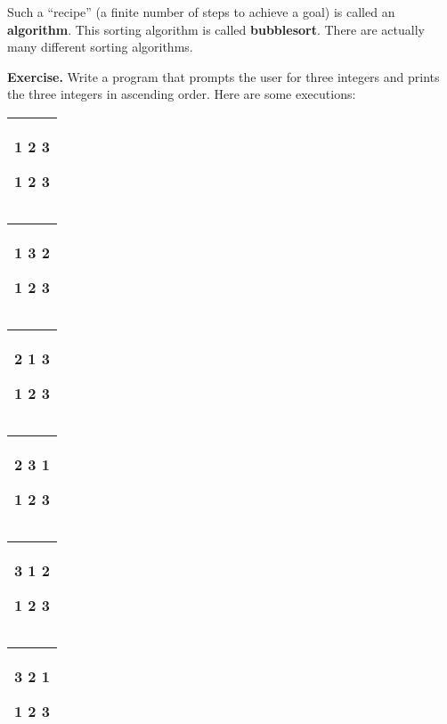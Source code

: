 \documentclass[
]{article}
\begin{document}
Such a ``recipe'' (a finite number of steps to achieve a goal) is called
an \textbf{algorithm}. This sorting algorithm is called
\textbf{bubblesort}. There are actually many different sorting
algorithms.

\textbf{Exercise.} Write a program that prompts the user for three
integers and prints the three integers in ascending order. Here are some
executions:

\begin{longtable}[]{@{}l@{}}
\toprule
\endhead
\begin{minipage}[t]{0.97\columnwidth}\raggedright
\textbf{1 2 3}

1 2 3\strut
\end{minipage}\tabularnewline
\bottomrule
\end{longtable}

\begin{longtable}[]{@{}l@{}}
\toprule
\endhead
\begin{minipage}[t]{0.97\columnwidth}\raggedright
\textbf{1 3 2}

1 2 3\strut
\end{minipage}\tabularnewline
\bottomrule
\end{longtable}

\begin{longtable}[]{@{}l@{}}
\toprule
\endhead
\begin{minipage}[t]{0.97\columnwidth}\raggedright
\textbf{2 1 3}

1 2 3\strut
\end{minipage}\tabularnewline
\bottomrule
\end{longtable}

\begin{longtable}[]{@{}l@{}}
\toprule
\endhead
\begin{minipage}[t]{0.97\columnwidth}\raggedright
\textbf{2 3 1}

1 2 3\strut
\end{minipage}\tabularnewline
\bottomrule
\end{longtable}

\begin{longtable}[]{@{}l@{}}
\toprule
\endhead
\begin{minipage}[t]{0.97\columnwidth}\raggedright
\textbf{3 1 2}

1 2 3\strut
\end{minipage}\tabularnewline
\bottomrule
\end{longtable}

\begin{longtable}[]{@{}l@{}}
\toprule
\endhead
\begin{minipage}[t]{0.97\columnwidth}\raggedright
\textbf{3 2 1}

1 2 3\strut
\end{minipage}\tabularnewline
\bottomrule
\end{longtable}
\end{document}
